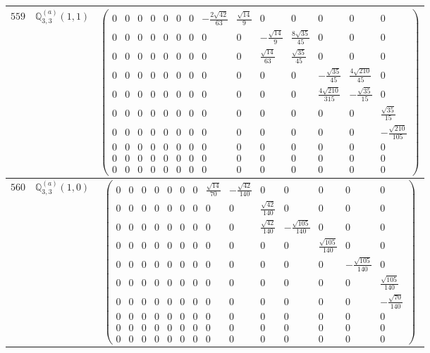 \documentclass[fleqn,8pt,landscape]{jsarticle}
\begin{document}
\begin{center}
\begin{longtable}{ccc}
$ 559 $ & $ \mathbb{Q}_{3,3}^{(a)}(1,1) $ & $ \begin{pmatrix} 0 & 0 & 0 & 0 & 0 & 0 & 0 & - \frac{2 \sqrt{42}}{63} & \frac{\sqrt{14}}{9} & 0 & 0 & 0 & 0 & 0 \\ 0 & 0 & 0 & 0 & 0 & 0 & 0 & 0 & 0 & - \frac{\sqrt{14}}{9} & \frac{8 \sqrt{35}}{45} & 0 & 0 & 0 \\ 0 & 0 & 0 & 0 & 0 & 0 & 0 & 0 & 0 & \frac{\sqrt{14}}{63} & \frac{\sqrt{35}}{45} & 0 & 0 & 0 \\ 0 & 0 & 0 & 0 & 0 & 0 & 0 & 0 & 0 & 0 & 0 & - \frac{\sqrt{35}}{45} & \frac{4 \sqrt{210}}{45} & 0 \\ 0 & 0 & 0 & 0 & 0 & 0 & 0 & 0 & 0 & 0 & 0 & \frac{4 \sqrt{210}}{315} & - \frac{\sqrt{35}}{15} & 0 \\ 0 & 0 & 0 & 0 & 0 & 0 & 0 & 0 & 0 & 0 & 0 & 0 & 0 & \frac{\sqrt{35}}{15} \\ 0 & 0 & 0 & 0 & 0 & 0 & 0 & 0 & 0 & 0 & 0 & 0 & 0 & - \frac{\sqrt{210}}{105} \\ 0 & 0 & 0 & 0 & 0 & 0 & 0 & 0 & 0 & 0 & 0 & 0 & 0 & 0 \\ 0 & 0 & 0 & 0 & 0 & 0 & 0 & 0 & 0 & 0 & 0 & 0 & 0 & 0 \\ 0 & 0 & 0 & 0 & 0 & 0 & 0 & 0 & 0 & 0 & 0 & 0 & 0 & 0 \end{pmatrix} $ \\ \hline
$ 560 $ & $ \mathbb{Q}_{3,3}^{(a)}(1,0) $ & $ \begin{pmatrix} 0 & 0 & 0 & 0 & 0 & 0 & 0 & \frac{\sqrt{14}}{70} & - \frac{\sqrt{42}}{140} & 0 & 0 & 0 & 0 & 0 \\ 0 & 0 & 0 & 0 & 0 & 0 & 0 & 0 & 0 & \frac{\sqrt{42}}{140} & 0 & 0 & 0 & 0 \\ 0 & 0 & 0 & 0 & 0 & 0 & 0 & 0 & 0 & \frac{\sqrt{42}}{140} & - \frac{\sqrt{105}}{140} & 0 & 0 & 0 \\ 0 & 0 & 0 & 0 & 0 & 0 & 0 & 0 & 0 & 0 & 0 & \frac{\sqrt{105}}{140} & 0 & 0 \\ 0 & 0 & 0 & 0 & 0 & 0 & 0 & 0 & 0 & 0 & 0 & 0 & - \frac{\sqrt{105}}{140} & 0 \\ 0 & 0 & 0 & 0 & 0 & 0 & 0 & 0 & 0 & 0 & 0 & 0 & 0 & \frac{\sqrt{105}}{140} \\ 0 & 0 & 0 & 0 & 0 & 0 & 0 & 0 & 0 & 0 & 0 & 0 & 0 & - \frac{\sqrt{70}}{140} \\ 0 & 0 & 0 & 0 & 0 & 0 & 0 & 0 & 0 & 0 & 0 & 0 & 0 & 0 \\ 0 & 0 & 0 & 0 & 0 & 0 & 0 & 0 & 0 & 0 & 0 & 0 & 0 & 0 \\ 0 & 0 & 0 & 0 & 0 & 0 & 0 & 0 & 0 & 0 & 0 & 0 & 0 & 0 \end{pmatrix} $ \\ \hline

\end{longtable}
\end{center}
\end{document}
